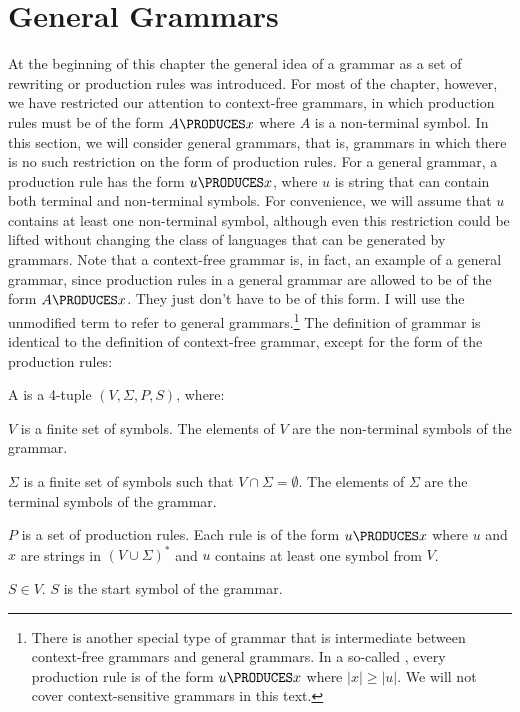 \section{General Grammars}\label{S-grammars-5}

At the beginning of this chapter the general idea of a grammar as a set of
rewriting or production rules was introduced.  For most of the chapter, however,
we have restricted our attention to context-free grammars, in which production
rules must be of the form $A\PRODUCES x$ where $A$ is a non-terminal symbol.
In this section, we will consider general grammars, that is, grammars in which
there is no such restriction on the form of production rules.  For a general
grammar, a production rule has the form $u\PRODUCES x$, where $u$ is string
that can contain both terminal and non-terminal symbols.  For convenience, we
will assume that $u$ contains at least one non-terminal symbol, although
even this restriction could be lifted without changing the class of languages
that can be generated by grammars.  Note that a context-free grammar is, in fact,
an example of a general grammar, since production rules in a general grammar
are allowed to be of the form $A\PRODUCES x$.  They just don't have to be of
this form.  I will use the unmodified term  to
refer to general grammars.\footnote{There is another special type of grammar that
is intermediate between context-free grammars and general grammars.  In a
so-called , every production rule is of the form
$u\PRODUCES x$ where $|x|\ge|u|$.  We will not cover context-sensitive grammars in
this text.}  The definition of grammar is identical to the
definition of context-free grammar, except for the form of the production rules:

\begin{definition}
A  is a 4-tuple $(V,\Sigma,P,S)$,
where:

$V$ is a finite set of symbols.  The elements of $V$
are the non-terminal symbols of the grammar.

$\Sigma$ is a finite set of symbols such that $V\cap\Sigma=\emptyset$.
The elements of $\Sigma$ are the terminal symbols of the grammar.

$P$ is a set of production rules.  Each rule is of the
form $u\PRODUCES x$ where $u$ and $x$ are strings in $(V\cup \Sigma)^*$
and $u$ contains at least one symbol from $V$.

$S\in V$.  $S$ is the start symbol of the grammar.
\end{definition}

